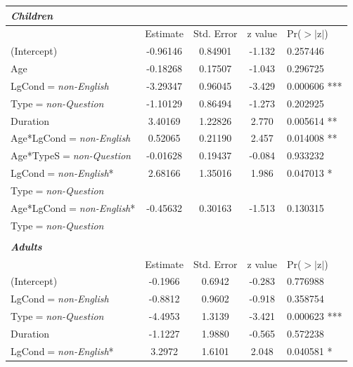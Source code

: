 \documentclass[authoryear, 12pt]{elsarticle}
\begin{document}
\begin{table}[h!]
\begin{center}
  \begin{tabular}{lcccl}
  \textbf{\textit{Children}} &&&& \\
    \hline
                   & Estimate & Std. Error & z value & Pr($>$$|$z$|$)    \\
    \hline
    (Intercept)   &      -0.96146 &   0.84901 & -1.132 & 0.257446 \\    
    Age             &    -0.18268 &   0.17507 & -1.043 & 0.296725   \\  
    LgCond$=$\textit{non-English} &          -3.29347 &   0.96045 & -3.429 & 0.000606 *** \\
    Type$=$\textit{non-Question}          &     -1.10129 &   0.86494 & -1.273 & 0.202925     \\
    Duration      &       3.40169 &   1.22826 &  2.770 & 0.005614  **\\
    Age*LgCond$=$\textit{non-English} &       0.52065 &   0.21190 &  2.457 & 0.014008 ** \\  
    Age*TypeS$=$\textit{non-Question}          & -0.01628 &   0.19437 & -0.084 & 0.933232     \\
    LgCond$=$\textit{non-English}* &     2.68166 &   1.35016 &  1.986 & 0.047013 * \\
    Type$=$\textit{non-Question} &&&& \\
    Age*LgCond$=$\textit{non-English}* & -0.45632 &   0.30163 & -1.513 & 0.130315  \\
    Type$=$\textit{non-Question} &&&& \\
    \hline
  &&&& \\
  \textbf{\textit{Adults}} &&&& \\
    \hline
                       &  Estimate & Std. Error & z value & Pr($>$$|$z$|$) \\    
    \hline
    (Intercept)       &        -0.1966 &    0.6942 & -0.283 & 0.776988     \\
    LgCond$=$\textit{non-English}    &             -0.8812 &    0.9602 & -0.918 & 0.358754   \\  
    Type$=$\textit{non-Question}             &        -4.4953 &    1.3139 & -3.421 & 0.000623 *** \\
    Duration          &        -1.1227 &    1.9880 & -0.565 & 0.572238     \\
    LgCond$=$\textit{non-English}* &           3.2972 &    1.6101 &  2.048 & 0.040581 * \\ 

\end{tabular}
\end{center}
\end{table}
\end{document}
